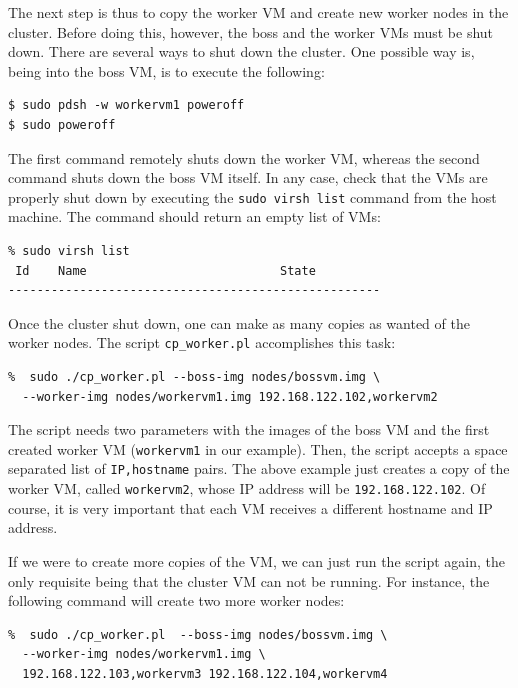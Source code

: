 \documentclass[a4]{article}
\begin{document}
The next step is thus to copy the worker VM and create new worker nodes in
the cluster. Before doing this, however, the boss and the worker VMs must be
shut down. There are several ways to shut down the cluster. One possible way
is, being into the boss VM, is to execute the following:

\begin{verbatim}
$ sudo pdsh -w workervm1 poweroff
$ sudo poweroff
\end{verbatim}

The first command remotely shuts down the worker VM, whereas the second
command shuts down the boss VM itself. In any case, check that the VMs are
properly shut down by executing the \texttt{sudo virsh list} command from
the host machine. The command should return an empty list of VMs:

\begin{verbatim}
% sudo virsh list
 Id    Name                           State
----------------------------------------------------
\end{verbatim}


Once the cluster shut down, one can make as many copies as wanted of the
worker nodes. The script \texttt{cp\_worker.pl} accomplishes this task:

\begin{verbatim}
%  sudo ./cp_worker.pl --boss-img nodes/bossvm.img \
  --worker-img nodes/workervm1.img 192.168.122.102,workervm2
\end{verbatim}

The script needs two parameters with the images of the boss VM and the first
created worker VM (\texttt{workervm1} in our example). Then, the script
accepts a space separated list of \texttt{IP,hostname} pairs. The above
example just creates a copy of the worker VM, called \texttt{workervm2},
whose IP address will be \texttt{192.168.122.102}. Of course, it is very
important that each VM receives a different hostname and IP address. 

If we were to create more copies of the VM, we can just run the script
again, the only requisite being that the cluster VM can not be running. For
instance, the following command will create two more worker nodes:

\begin{verbatim}
%  sudo ./cp_worker.pl  --boss-img nodes/bossvm.img \
  --worker-img nodes/workervm1.img \
  192.168.122.103,workervm3 192.168.122.104,workervm4
\end{verbatim}
\end{document}
